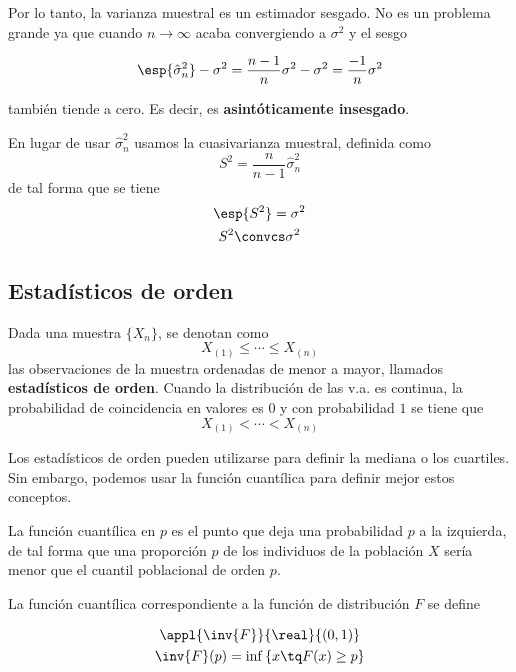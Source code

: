 \documentclass{apuntes}
\begin{document}
Por lo tanto, la varianza muestral es un estimador sesgado. No es un problema grande ya que cuando $n\to\infty$ acaba convergiendo a $\sigma^2$ y el sesgo

\[ \esp{\hat{\sigma}^2_n} - \sigma^2= \frac{n-1}{n}\sigma^2 - \sigma^2 = \frac{-1}{n}\sigma^2 \]

también tiende a cero. Es decir, es  \textbf{asintóticamente insesgado}.

\begin{defn}
En lugar de usar $\hat{\sigma}^2_n$ usamos la cuasivarianza muestral, definida como
\[ S^2 = \frac{n}{n-1}\hat{\sigma}^2_n \]
de tal forma que se tiene
\begin{gather*}
\esp{S^2} = \sigma^2 \\
S^2 \convcs \sigma^2
\end{gather*}
\end{defn}
\subsection{Estadísticos de orden}

\pagebreak
\begin{defn}
Dada una muestra $\{X_n\}$, se denotan como \[ X_{(1)} \leq \dotsb \leq X_{(n)} \] las observaciones de la muestra ordenadas de menor a mayor, llamados \textbf{estadísticos de orden}. Cuando la distribución de las v.a. es continua, la probabilidad de coincidencia en valores es $0$ y con probabilidad $1$ se tiene que \[ X_{(1)} < \dotsb < X_{(n)} \]
\end{defn}

Los estadísticos de orden pueden utilizarse para definir la mediana o los cuartiles. Sin embargo, podemos usar la función cuantílica para definir mejor estos conceptos.

\begin{defn} La función cuantílica en $p$ es el punto que deja una probabilidad $p$ a la izquierda, de tal forma que una proporción $p$ de los individuos de la población $X$ sería menor que el cuantil poblacional de orden $p$.

La función cuantílica correspondiente a la función de distribución $F$ se define

\begin{gather*}
\appl{\inv{F}}{\real}{(0,1)} \\
\inv{F}(p) = \inf \left\lbrace x \tq F(x) \geq p \right\rbrace
\end{gather*}
\end{defn}
\end{document}
